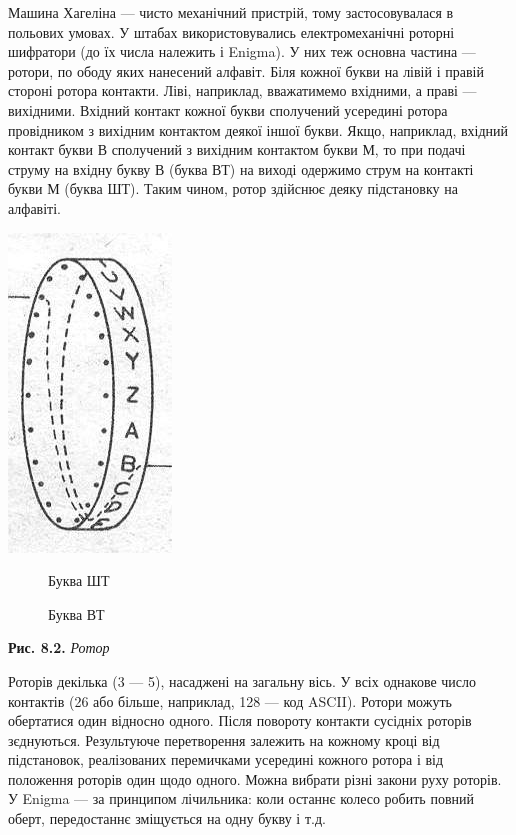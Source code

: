 Машина Хагеліна --- чисто механічний пристрій, тому застосовувалася в польових
умовах. У штабах використовувались електромеханічні роторні шифратори (до їх
числа належить і Enigma). У них теж основна частина --- ротори, по ободу яких
нанесений алфавіт. Біля кожної букви на лівій і правій стороні ротора контакти.
Ліві, наприклад, вважатимемо вхідними, а праві --- вихідними. Вхідний контакт
кожної букви сполучений усередині ротора провідником з вихідним контактом
деякої іншої букви. Якщо, наприклад, вхідний контакт букви В сполучений з
вихідним контактом букви М, то при подачі струму на вхідну букву В (буква ВТ)
на виході одержимо струм на контакті букви М (буква ШТ). Таким чином, ротор
здійснює деяку підстановку на алфавіті.

{\centering 
\includegraphics[width=1.7083in,height=3.3335in]{crypt-img/crypt-img78.jpg}
\par}

\begin{figure}
\centering
\begin{minipage}{0.9374in}
Буква ШТ
\end{minipage}
\end{figure}
\begin{figure}
\centering
\begin{minipage}{0.9665in}
Буква ВТ
\end{minipage}
\end{figure}
{\centering
\textbf{Рис. 8.2.  }\textit{Ротор}
\par}


\bigskip

Роторів декілька (3 --- 5), насаджені на загальну вісь. У всіх однакове число
контактів (26 або більше, наприклад, 128 --- код ASCII). Ротори можуть обертатися
один відносно одного. Після повороту контакти сусідніх роторів
з{\textquotesingle}єднуються. Результуюче перетворення залежить на кожному
кроці від підстановок, реалізованих перемичками усередині кожного ротора і від
положення роторів один щодо одного. Можна вибрати різні закони руху роторів. У
Enigma --- за принципом лічильника: коли останнє колесо робить повний оберт,
передостаннє зміщується на одну букву і т.д.



